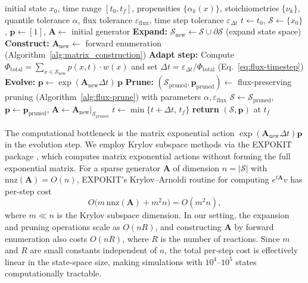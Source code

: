 \documentclass[onefignum,onetabnum]{siamart171218}
\begin{document}
\begin{algorithm}[H]
\caption{Flux-Adaptive FSP}
\label{alg:fsp-flux-adaptive}
\begin{algorithmic}[1]
\REQUIRE initial state $x_0$, time range $[t_0,t_f]$, propensities $\{\alpha_k(x)\}$, stoichiometries $\{\nu_k\}$, quantile tolerance $\alpha$, flux tolerance $\varepsilon_{\mathrm{flux}}$, time step tolerance $\varepsilon_{\Delta t}$
\STATE $t \gets t_0$, \; $\mathcal{S} \gets \{x_0\}$, \; $\boldsymbol{p} \gets [1]$, \; $\mathbf{A} \gets$ initial generator
  \STATE \textbf{Expand:} $\mathcal{S}_{\text{new}} \gets \mathcal{S} \cup \partial \mathcal{S}$ (expand state space)
  \STATE \textbf{Construct:} $\mathbf{A}_{\text{new}} \gets$ forward enumeration (Algorithm~\ref{alg:matrix_construction})
  \STATE \textbf{Adapt step:} Compute $\Phi_{\mathrm{total}} = \sum_{x \in \mathcal{S}_{\text{new}}} p(x,t) \cdot w(x)$ and set $\Delta t = \varepsilon_{\Delta t}/\Phi_{\mathrm{total}}$ (Eq.~\eqref{eq:flux-timestep})
  \STATE \textbf{Evolve:} $\boldsymbol{p} \gets \exp(\mathbf{A}_{\text{new}}\Delta t)\,\boldsymbol{p}$
  \STATE \textbf{Prune:} $(\mathcal{S}_{\text{pruned}}, \boldsymbol{p}_{\text{pruned}}) \gets$ flux-preserving pruning (Algorithm~\ref{alg:flux-prune}) with parameters $\alpha, \varepsilon_{\mathrm{flux}}$
  \STATE $\mathcal{S} \gets \mathcal{S}_{\text{pruned}}$, \; $\boldsymbol{p} \gets \boldsymbol{p}_{\text{pruned}}$, \; $\mathbf{A} \gets \mathbf{A}_{\text{new}}|_{\mathcal{S}_{\text{pruned}}}$
  \STATE $t \gets \min\{t+\Delta t,\,t_f\}$
\ENDWHILE
\STATE \textbf{return} $(\mathcal{S},\boldsymbol{p})$ at $t_f$
\end{algorithmic}
\end{algorithm}



The computational bottleneck is the matrix exponential action $\exp(\mathbf{A}_{\text{new}}\Delta t)\boldsymbol{p}$ in the evolution step. We employ Krylov subspace methods via the EXPOKIT package \cite{Sidje1998}, which computes matrix exponential actions without forming the full exponential matrix. For a sparse generator $\mathbf{A}$ of dimension $n = |\mathcal{S}|$ with
$\mathrm{nnz}(\mathbf{A}) = O(n)$, EXPOKIT's Krylov--Arnoldi routine for
computing $e^{t\mathbf{A}} v$ has per-step cost
\[
  O\bigl(m\,\mathrm{nnz}(\mathbf{A}) + m^2 n\bigr) = O(m^2 n),
\]
where $m \ll n$ is the Krylov subspace dimension. In our setting, the
expansion and pruning operations scale as $O(nR)$, and constructing
$\mathbf{A}$ by forward enumeration also costs $O(nR)$, where $R$ is the
number of reactions. Since $m$ and $R$ are small constants independent of
$n$, the total per-step cost is effectively linear in the state-space size,
making simulations with $10^4$--$10^5$ states computationally tractable.
\end{document}
